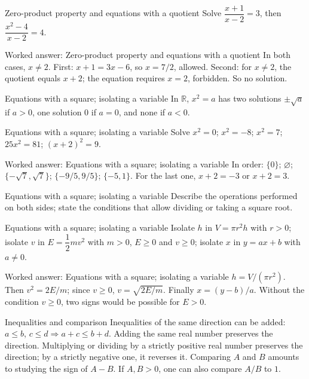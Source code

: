 \documentclass[aspectratio=169,10pt]{beamer}
\providecommand{\R}{\mathbb{R}}
\begin{document}
\begin{frame}{Zero-product property and equations with a quotient}
Solve \(\dfrac{x+1}{x-2}=3\), then \(\dfrac{x^2-4}{x-2}=4\).
\end{frame}
\begin{frame}{Worked answer: Zero-product property and equations with a quotient}
In both cases, \(x\ne2\). First: \(x+1=3x-6\), so \(x=7/2\), allowed. Second: for \(x\ne2\), the quotient equals \(x+2\); the equation requires \(x=2\), forbidden. So no solution.
\end{frame}
\begin{frame}{Equations with a square; isolating a variable}
In \(\R\), \(x^2=a\) has two solutions \(\pm\sqrt a\) if \(a>0\), one solution \(0\) if \(a=0\), and none if \(a<0\).
\end{frame}
\begin{frame}{Equations with a square; isolating a variable}
Solve \(x^2=0\); \(x^2=-8\); \(x^2=7\); \(25x^2=81\); \((x+2)^2=9\).
\end{frame}
\begin{frame}{Worked answer: Equations with a square; isolating a variable}
In order: \(\{0\}\); \(\varnothing\); \(\{-\sqrt7,\sqrt7\}\); \(\{-9/5,9/5\}\); \(\{-5,1\}\). For the last one, \(x+2=-3\) or \(x+2=3\).
\end{frame}
\begin{frame}{Equations with a square; isolating a variable}
Describe the operations performed on both sides; state the conditions that allow dividing or taking a square root.
\end{frame}
\begin{frame}{Equations with a square; isolating a variable}
Isolate \(h\) in \(V=\pi r^2h\) with \(r>0\); isolate \(v\) in \(E=\dfrac12mv^2\) with \(m>0\), \(E\geq0\) and \(v\geq0\); isolate \(x\) in \(y=ax+b\) with \(a\ne0\).
\end{frame}
\begin{frame}{Worked answer: Equations with a square; isolating a variable}
\(h=V/(\pi r^2)\). Then \(v^2=2E/m\); since \(v\geq0\), \(v=\sqrt{2E/m}\). Finally \(x=(y-b)/a\). Without the condition \(v\geq0\), two signs would be possible for \(E>0\).
\end{frame}
\begin{frame}{Inequalities and comparison}
Inequalities of the same direction can be added: \(a\leq b\), \(c\leq d\Rightarrow a+c\leq b+d\). Adding the same real number preserves the direction. Multiplying or dividing by a strictly positive real number preserves the direction; by a strictly negative one, it reverses it.
Comparing \(A\) and \(B\) amounts to studying the sign of \(A-B\). If \(A,B>0\), one can also compare \(A/B\) to \(1\).
\end{frame}
\end{document}
